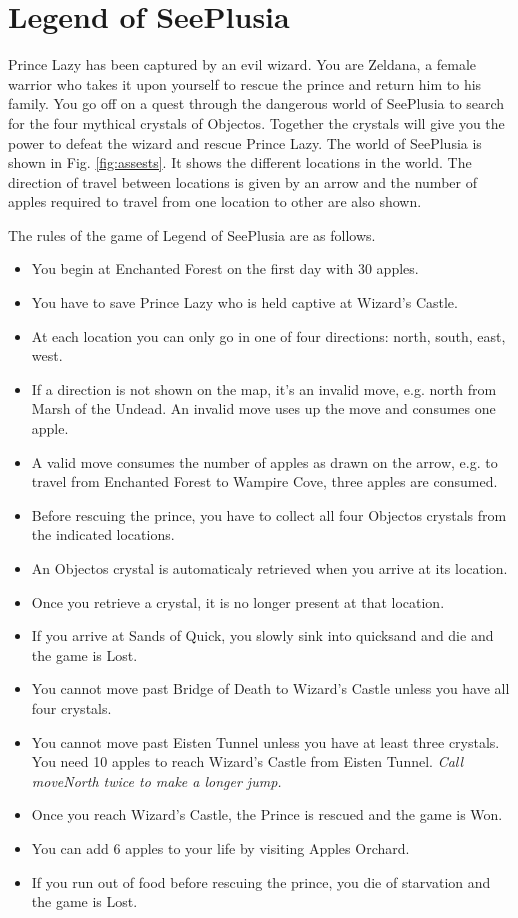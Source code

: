 \documentclass[a4paper,12pt]{article}
\begin{document}
	\newpage
	
	\section{Legend of SeePlusia}

	Prince Lazy has been captured by an evil wizard. You are Zeldana, a female warrior who takes it upon
	yourself to rescue the prince and return him to his family. You go off on a quest through the dangerous
	world of SeePlusia to search for the four mythical crystals of Objectos. Together the crystals will give
	you the power to defeat the wizard and rescue Prince Lazy.
	The world of SeePlusia is shown in Fig. \ref{fig:assests}. It shows the different locations in the world. The direction of travel between locations is given by an arrow and the number of apples required to travel from one location to other are also shown.
	
	The rules of the game of Legend of SeePlusia are as follows.
\begin{itemize}
	\item You begin at Enchanted Forest on the first day with 30 apples.
	\item You have to save Prince Lazy who is held captive at Wizard's Castle.
	\item At each location you can only go in one of four directions: north, south, east, west.
	\item If a direction is not shown on the map, it's an invalid move, e.g. north from
	Marsh of the Undead. An invalid move uses up the move and consumes one apple.
	\item A valid move consumes the number of apples as drawn on the arrow, e.g. to travel from Enchanted Forest to Wampire Cove, three apples are consumed.
	\item Before rescuing the prince, you have to collect all four Objectos crystals from the indicated locations.
	\item An Objectos crystal is automaticaly retrieved when you arrive at its location.
	\item Once you retrieve a crystal, it is no longer present at that location.
	\item If you arrive at Sands of Quick, you slowly sink into quicksand and die and the game is Lost.
	\item You cannot move past Bridge of Death to Wizard's Castle unless you have all four crystals.
	\item You cannot move past Eisten Tunnel unless you have at least three crystals. You need 10 apples to reach Wizard's Castle from Eisten Tunnel. \textit{Call moveNorth twice to make a longer jump.}
	\item Once you reach Wizard’s Castle, the Prince is rescued and the game is Won.
	\item You can add 6 apples to your life by visiting Apples Orchard.
	\item If you run out of food before rescuing the prince, you die of starvation and the game is Lost.
\end{itemize}
	
\end{document}
